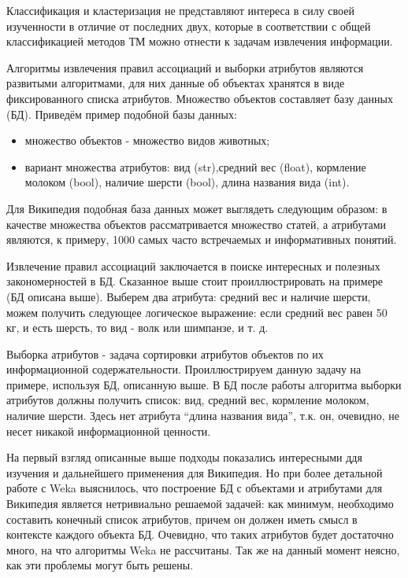 Классификация и кластеризация не представляют интереса в силу своей изученности в отличие от
последних двух, которые в соответствии с общей классификацией методов ТМ можно отнести к задачам
извлечения информации.

Алгоритмы извлечения правил ассоциаций и выборки атрибутов являются развитыми алгоритмами,
для них данные об объектах хранятся в виде фиксированного списка атрибутов. Множество объектов
составляет базу данных (БД). Приведём пример подобной базы данных:
\begin{itemize}
\item{множество объектов - множество видов животных;}
\item{вариант множества атрибутов: вид (str),средний вес (float), кормление молоком (bool),
наличие шерсти (bool), длина названия вида (int).}
\end{itemize}


Для Википедия подобная база данных может выглядеть следующим образом: в качестве множества
объектов рассматривается множество статей, а атрибутами являются, к примеру, 1000 самых часто
встречаемых и информативных понятий. 

Извлечение правил ассоциаций заключается в поиске интересных и полезных закономерностей в БД.
Сказанное выше стоит проиллюстрировать на примере (БД описана выше). Выберем два атрибута: средний 
вес и наличие шерсти, можем получить следующее логическое выражение: если средний вес равен 
50 кг, и есть шерсть, то вид - волк или шимпанзе, и т. д.

Выборка атрибутов - задача сортировки атрибутов объектов по их информационной содержательности.
Проиллюстрируем данную задачу на примере, используя БД, описанную выше. В БД после работы 
алгоритма выборки атрибутов должны получить список: вид, средний вес, кормление молоком, 
наличие шерсти. Здесь нет атрибута “длина названия вида'', т.к. он, очевидно, не несет
никакой информационной ценности.

На первый взгляд описанные выше подходы показались интересными ддя изучения и дальнейшего
применения для Википедия. Но при более детальной работе с Weka выяснилось, что
построение БД с объектами и атрибутами для Википедия является нетривиально решаемой задачей:
как минимум, необходимо составить конечный список атрибутов, причем он должен иметь смысл 
в контексте каждого объекта БД. Очевидно, что таких атрибутов будет достаточно много,
на что алгоритмы Weka не рассчитаны. Так же на данный момент неясно, как эти проблемы
могут быть решены.
 
